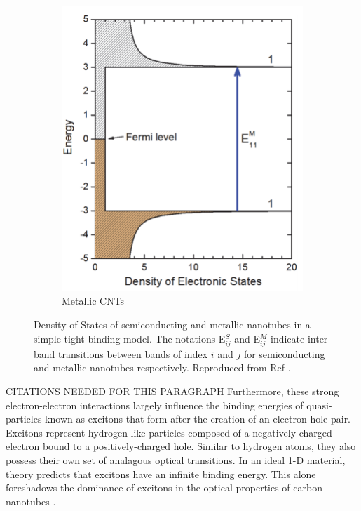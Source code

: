 \begin{figure}
\begin{subfigure}[t]{0.4\textwidth}
		\includegraphics[scale=0.37]{images/chapter_optical_props/dos_metallic_weismanKono_book}
		\caption{Metallic CNTs}
	\end{subfigure}	
	
	\caption{Density of States of semiconducting and metallic nanotubes in a simple tight-binding model. The notations E$_{ij}^S$ and E$_{ij}^M$ indicate inter-band transitions between bands of index $i$ and $j$ for semiconducting and metallic nanotubes respectively.  Reproduced from Ref \cite{weismanKonoBook}.}
\end{figure}

{\color{red}CITATIONS NEEDED FOR THIS PARAGRAPH} Furthermore, these strong electron-electron interactions largely influence the binding energies of quasi-particles known as excitons that form after the creation of an electron-hole pair. Excitons represent hydrogen-like particles composed of a negatively-charged electron bound to a positively-charged hole. Similar to hydrogen atoms, they also possess their own set of analagous optical transitions. In an ideal 1-D material, theory predicts that excitons have an infinite binding energy. This alone foreshadows the dominance of excitons in the optical properties of carbon nanotubes \cite{ando2005theory}. 

